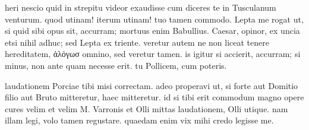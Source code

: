 


 heri nescio quid in strepitu videor exaudisse cum diceres te in Tusculanum venturum. quod utinam! iterum utinam! tuo tamen commodo. Lepta me rogat ut, si quid sibi opus sit, accurram; mortuus enim Babullius. Caesar, opinor, ex uncia etsi nihil adhuc; sed Lepta ex triente. veretur autem ne non liceat tenere hereditatem, ἀλόγωσ omnino, sed veretur tamen. is igitur si accierit, accurram; si minus, non ante quam necesse erit. tu Pollicem, cum poteris.

 laudationem Porciae tibi misi correctam. adeo properavi ut, si forte aut Domitio filio aut Bruto mitteretur, haec mitteretur. id si tibi erit commodum magno opere cures velim et velim M. Varronis et Olli mittas laudationem, Olli utique. nam illam legi, volo tamen regustare. quaedam enim vix mihi credo legisse me.
